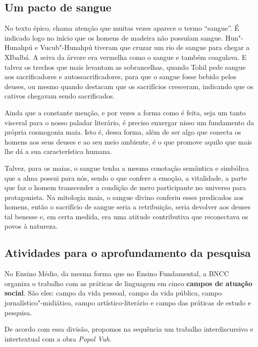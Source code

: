 \documentclass[11pt]{extarticle}
\begin{document}
\subsection{Um pacto de sangue}

No texto épico, chama atenção que muitas vezes aparece o termo
``sangue''. É indicado logo no início que os homens de madeira não
possuíam sangue. Hun"-Hunahpú e Vucub"-Hunahpú tiveram que cruzar um rio
de sangue para chegar a XIbalbá. A seiva da árvore era vermelha como o
sangue e também coagulava. E talvez os trechos que mais levantam as
sobrancelhas, quando Tohil pede sangue aos sacrificadores e
autossacrificadores, para que o sangue fosse bebido pelos deuses, ou
mesmo quando destacam que os sacrifícios cresceram, indicando que os
cativos chegavam sendo sacrificados.

Ainda que a constante menção, e por vezes a forma como é feita, seja um
tanto visceral para o nosso paladar literário, é preciso enxergar nisso
um fundamento da própria cosmogonia maia. Isto é, dessa forma, além de
ser algo que conecta os homens aos seus deuses e ao seu meio ambiente, é
o que promove aquilo que mais lhe dá a sua característica humana.

Talvez, para os maias, o sangue tenha a mesma conotação semântica e
simbólica que a alma possui para nós, sendo o que confere a emoção, a
vitalidade, a parte que faz o homem transcender a condição de mero
participante no universo para protagonista. Na mitologia maia, o sangue
divino conferiu esses predicados aos homens, então o sacrifício de
sangue seria a retribuição, seria devolver aos deuses tal benesse e, em
certa medida, era uma atitude contributiva que reconectava os povos à
natureza.




\subsection{Atividades para o aprofundamento da pesquisa}

No Ensino Médio, da mesma forma que no Ensino Fundamental, a BNCC
organiza o trabalho com as práticas de linguagem em cinco \textbf{campos
de atuação social}. São eles: campo da vida pessoal, campo da vida
pública, campo jornalístico"-midiático, campo artístico-literário e campo
das práticas de estudo e pesquisa.

De acordo com essa divisão, propomos na sequência um trabalho
interdiscursivo e intertextual com a obra \emph{Popol Vuh}.
\end{document}
